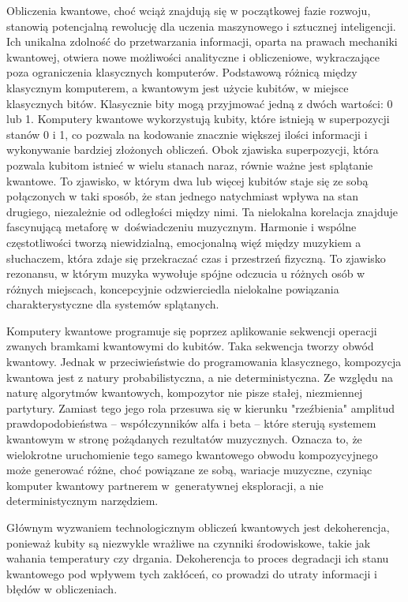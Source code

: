 Obliczenia kwantowe, choć wciąż znajdują się w początkowej fazie rozwoju, stanowią potencjalną rewolucję dla uczenia maszynowego i sztucznej inteligencji. Ich unikalna zdolność do przetwarzania informacji, oparta na prawach mechaniki kwantowej, otwiera nowe możliwości analityczne i obliczeniowe, wykraczające poza ograniczenia klasycznych komputerów.
Podstawową różnicą między klasycznym komputerem, a kwantowym jest użycie kubitów, w miejsce klasycznych bitów. Klasycznie bity mogą przyjmować jedną z dwóch wartości: 0 lub 1. Komputery kwantowe wykorzystują kubity, które istnieją w superpozycji stanów 0 i 1, co pozwala na kodowanie znacznie większej ilości informacji i wykonywanie bardziej złożonych obliczeń.
Obok zjawiska superpozycji, która pozwala kubitom istnieć w wielu stanach naraz, równie ważne jest splątanie kwantowe. To zjawisko, w którym dwa lub więcej kubitów staje się ze sobą połączonych w taki sposób, że stan jednego natychmiast wpływa na stan drugiego, niezależnie od odległości między nimi. Ta nielokalna korelacja znajduje fascynującą metaforę w~doświadczeniu muzycznym. Harmonie i wspólne częstotliwości tworzą niewidzialną, emocjonalną więź między muzykiem a słuchaczem, która zdaje się przekraczać czas i przestrzeń fizyczną. To zjawisko rezonansu, w którym muzyka wywołuje spójne odczucia u różnych osób w różnych miejscach, koncepcyjnie odzwierciedla nielokalne powiązania charakterystyczne dla systemów splątanych\cite{miranda2021quantum}.

Komputery kwantowe programuje się poprzez aplikowanie sekwencji operacji zwanych bramkami kwantowymi do kubitów. Taka sekwencja tworzy obwód kwantowy. Jednak w przeciwieństwie do programowania klasycznego, kompozycja kwantowa jest z natury probabilistyczna, a nie deterministyczna. Ze względu na naturę algorytmów kwantowych, kompozytor nie pisze stałej, niezmiennej partytury. Zamiast tego jego rola przesuwa się w kierunku "rzeźbienia" amplitud prawdopodobieństwa – współczynników alfa i beta – które sterują systemem kwantowym w stronę pożądanych rezultatów muzycznych. Oznacza to, że wielokrotne uruchomienie tego samego kwantowego obwodu kompozycyjnego może generować różne, choć powiązane ze sobą, wariacje muzyczne, czyniąc komputer kwantowy partnerem w~generatywnej eksploracji, a nie deterministycznym narzędziem\cite{lee2024application}.

Głównym wyzwaniem technologicznym obliczeń kwantowych jest dekoherencja, ponieważ kubity są niezwykle wrażliwe na czynniki środowiskowe, takie jak wahania temperatury czy drgania. Dekoherencja to proces degradacji ich stanu kwantowego pod wpływem tych zakłóceń, co prowadzi do utraty informacji i błędów w obliczeniach.

